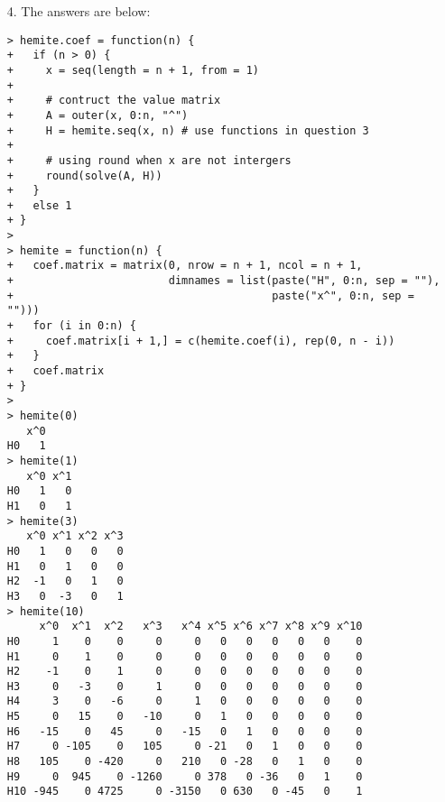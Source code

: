 \documentclass[11pt]{report}
\theoremstyle{definition}
\theoremstyle{remark}
\begin{document}
\begin{enumerate}
    \item[4.] The answers are below:
    \begin{verbatim}> hemite.coef = function(n) {
+   if (n > 0) {
+     x = seq(length = n + 1, from = 1)
+
+     # contruct the value matrix
+     A = outer(x, 0:n, "^")
+     H = hemite.seq(x, n) # use functions in question 3
+
+     # using round when x are not intergers
+     round(solve(A, H))
+   }
+   else 1
+ }
>
> hemite = function(n) {
+   coef.matrix = matrix(0, nrow = n + 1, ncol = n + 1,
+                        dimnames = list(paste("H", 0:n, sep = ""),
+                                        paste("x^", 0:n, sep = "")))
+   for (i in 0:n) {
+     coef.matrix[i + 1,] = c(hemite.coef(i), rep(0, n - i))
+   }
+   coef.matrix
+ }
>
> hemite(0)
   x^0
H0   1
> hemite(1)
   x^0 x^1
H0   1   0
H1   0   1
> hemite(3)
   x^0 x^1 x^2 x^3
H0   1   0   0   0
H1   0   1   0   0
H2  -1   0   1   0
H3   0  -3   0   1
> hemite(10)
     x^0  x^1  x^2   x^3   x^4 x^5 x^6 x^7 x^8 x^9 x^10
H0     1    0    0     0     0   0   0   0   0   0    0
H1     0    1    0     0     0   0   0   0   0   0    0
H2    -1    0    1     0     0   0   0   0   0   0    0
H3     0   -3    0     1     0   0   0   0   0   0    0
H4     3    0   -6     0     1   0   0   0   0   0    0
H5     0   15    0   -10     0   1   0   0   0   0    0
H6   -15    0   45     0   -15   0   1   0   0   0    0
H7     0 -105    0   105     0 -21   0   1   0   0    0
H8   105    0 -420     0   210   0 -28   0   1   0    0
H9     0  945    0 -1260     0 378   0 -36   0   1    0
H10 -945    0 4725     0 -3150   0 630   0 -45   0    1\end{verbatim}


\end{enumerate}
\end{document}

